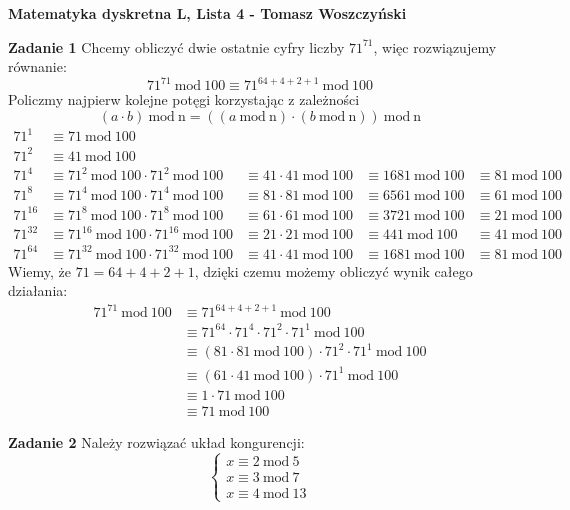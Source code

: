 \documentclass[a4paper,12pt]{article}
\newcommand{\Mod}[1]{\ \mathrm{mod\ #1}}
\begin{document}
\noindent \textbf{Matematyka dyskretna L, Lista 4 - Tomasz Woszczyński}\newline

\noindent \newline \textbf{Zadanie 1} \newline
Chcemy obliczyć dwie ostatnie cyfry liczby $71^{71}$, więc rozwiązujemy równanie:
$$ 71^{71} \Mod 100 \equiv 71^{64 + 4 + 2 + 1} \Mod 100$$
Policzmy najpierw kolejne potęgi korzystając z zależności
$$(a\cdot b) \Mod n = ((a \Mod n)\cdot (b \Mod n)) \Mod n$$
$$
\begin{aligned}
71^1 		&\equiv 71 \Mod 100 \\
71^2		&\equiv 41 \Mod 100 \\
71^4 		&\equiv 71^2 \Mod 100 \cdot 71^2 \Mod 100 		&\equiv 41\cdot 41 \Mod 100 &\equiv 1681 \Mod 100 &\equiv 81 \Mod 100 \\
71^8 		&\equiv 71^4 \Mod 100 \cdot 71^4 \Mod 100 		&\equiv 81\cdot 81 \Mod 100 &\equiv 6561 \Mod 100 &\equiv 61 \Mod 100 \\
71^{16} 	&\equiv 71^8 \Mod 100 \cdot 71^8 \Mod 100	 	&\equiv 61\cdot 61 \Mod 100 &\equiv 3721 \Mod 100 &\equiv 21 \Mod 100 \\
71^{32}	&\equiv 71^{16} \Mod 100 \cdot 71^{16} \Mod 100	&\equiv 21\cdot 21 \Mod 100 &\equiv  441 \Mod 100 &\equiv 41 \Mod 100 \\
71^{64}	&\equiv 71^{32} \Mod 100 \cdot 71^{32} \Mod 100 &\equiv 41\cdot 41 \Mod 100 &\equiv 1681 \Mod 100 &\equiv 81 \Mod 100
\end{aligned}
$$
Wiemy, że $71 = 64 + 4 + 2 + 1$, dzięki czemu możemy obliczyć wynik całego działania:
$$ 
\begin{aligned}
71^{71} \Mod 100	&\equiv 71^{64 + 4 + 2 + 1} \Mod 100 \\
				&\equiv 71^{64}\cdot 71^4\cdot 71^2\cdot 71^1 \Mod 100 \\
				&\equiv (81 \cdot 81 \Mod 100) \cdot 71^2\cdot 71^1 \Mod 100 \\
				&\equiv (61 \cdot 41 \Mod 100) \cdot 71^1 \Mod 100 \\
				&\equiv 1 \cdot 71 \Mod 100 \\
				&\equiv 71 \Mod 100
\end{aligned}
$$

\noindent \newline \textbf{Zadanie 2} \newline
Należy rozwiązać układ kongurencji:
$$
\begin{cases}
x \equiv 2 \Mod 5 \\
x \equiv 3 \Mod 7 \\
x \equiv 4 \Mod 13
\end{cases}
$$
\end{document}
